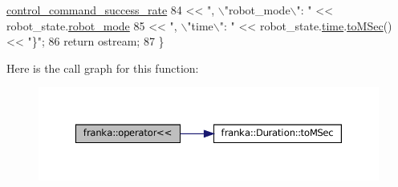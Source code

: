 \begin{DoxyCode}
      \hyperlink{structfranka_1_1RobotState_af208572613a6afcdc61a24970c71fa28}{control\_command\_success\_rate}
84           << \textcolor{stringliteral}{", \(\backslash\)"robot\_mode\(\backslash\)": "} << robot\_state.\hyperlink{structfranka_1_1RobotState_a4943ae75e0e2ec534e0afac31cbcc987}{robot\_mode}
85           << \textcolor{stringliteral}{", \(\backslash\)"time\(\backslash\)": "} << robot\_state.\hyperlink{structfranka_1_1RobotState_aabfdabeaef8c1858c52dd32344bdd039}{time}.\hyperlink{classfranka_1_1Duration_a2a25ae33c8739b8f705f13798aa9e162}{toMSec}() << \textcolor{stringliteral}{"\}"};
86   \textcolor{keywordflow}{return} ostream;
87 \}
\end{DoxyCode}
Here is the call graph for this function\+:
\nopagebreak
\begin{figure}[H]
\begin{center}
\leavevmode
\includegraphics[width=350pt]{namespacefranka_af7f0b8af2eb1f9a3cc2077a3c8fcf1d6_cgraph}
\end{center}
\end{figure}
\mbox{\label{namespacefranka_a60d46a3f821f6f0faf942974d0c63146}} 
